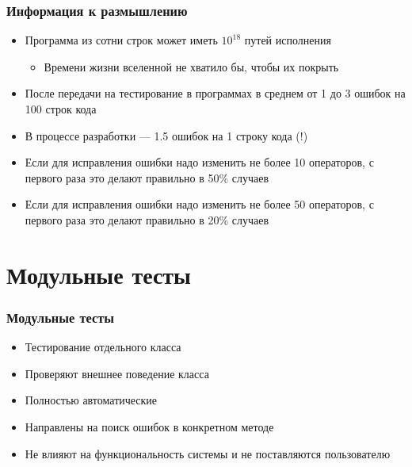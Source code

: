 \documentclass{../../slides-style}
\begin{document}
    \begin{frame}
        \frametitle{Информация к размышлению}
        \begin{itemize}
            \item Программа из сотни строк может иметь $10^{18}$ путей исполнения
            \begin{itemize}
                \item Времени жизни вселенной не хватило бы, чтобы их покрыть
            \end{itemize}
            \item После передачи на тестирование в программах в среднем от 1 до 3 ошибок на 100 строк кода
            \item В процессе разработки --- 1.5 ошибок на 1 строку кода (!)
            \item Если для исправления ошибки надо изменить не более 10 операторов, с первого раза это делают правильно в 50\% случаев
            \item Если для исправления ошибки надо изменить не более 50 операторов, с первого раза это делают правильно в 20\% случаев
        \end{itemize}
    \end{frame}

    \section{Модульные тесты}

    \begin{frame}
        \frametitle{Модульные тесты}
        \begin{itemize}
            \item Тестирование отдельного класса
            \item Проверяют внешнее поведение класса
            \item Полностью автоматические
            \item Направлены на поиск ошибок в конкретном методе
            \item Не влияют на функциональность системы и не поставляются пользователю
        \end{itemize}
    \end{frame}
\end{document}
